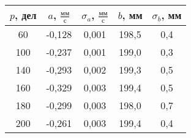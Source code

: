 \begin{tabular}[t]{|c|c|c|c|c|}
\hline
$p$, дел & $a$, $\frac{мм}{с}$ & $\sigma_a$, $\frac{мм}{с}$ & $b$, мм & $\sigma_b$, мм \\ 
\hline
60 & -0,128 & 0,001 & 198,5 & 0,4 \\ 
100 & -0,237 & 0,001 & 199,0 & 0,3 \\ 
140 & -0,293 & 0,002 & 199,3 & 0,5 \\ 
160 & -0,329 & 0,003 & 199,4 & 0,5 \\ 
180 & -0,299 & 0,003 & 198,0 & 0,7 \\ 
200 & -0,261 & 0,003 & 199,4 & 0,4 \\ 
\hline
\end{tabular}